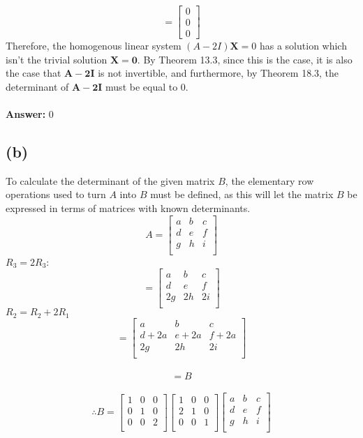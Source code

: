 \documentclass[11pt]{article}
\begin{document}
$$=\begin{bmatrix}0\\0\\0\end{bmatrix}$$
Therefore, the homogenous linear system $(A-2I)\mathbf{X}=0$ has a solution which isn't the trivial solution $\mathbf{X=0}$. By Theorem 13.3, since this is the case, it is also the case that $\mathbf{A-2I}$ is not invertible, and furthermore, by Theorem 18.3, the determinant of $\mathbf{A-2I}$ must be equal to 0.\\\\
\textbf{Answer:} 0
\subsection*{(b)}
To calculate the determinant of the given matrix $B$, the elementary row operations used to turn $A$ into $B$ must be defined, as this will let the matrix $B$ be expressed in terms of matrices with known determinants. 
$$A= \begin{bmatrix}
a & b & c \\
d & e & f \\
g & h & i \\
\end{bmatrix}$$
$R_3=2R_3$:
$$= \begin{bmatrix}
a & b & c \\
d & e & f \\
2g & 2h & 2i \\
\end{bmatrix}$$
$R_2=R_2+2R_1$
$$= \begin{bmatrix}
a & b & c \\
d + 2a & e + 2a & f + 2a \\
2g & 2h & 2i \\
\end{bmatrix}$$
\\$$=B$$\\
$$\therefore B = \begin{bmatrix}
1 & 0 & 0 \\
0 & 1 & 0 \\
0 & 0 & 2 \\
\end{bmatrix}
\begin{bmatrix}
1 & 0 & 0 \\
2 & 1 & 0 \\
0 & 0 & 1 \\
\end{bmatrix}
\begin{bmatrix}
a & b & c \\
d & e & f \\
g & h & i \\
\end{bmatrix}$$\\
\end{document}
